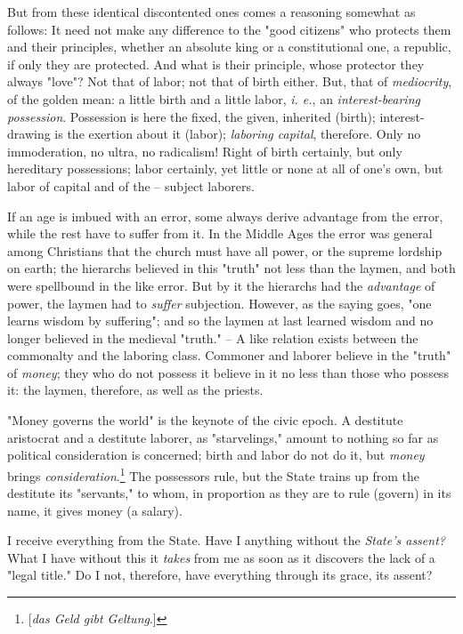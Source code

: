 \documentclass[a4paper]{book}
\begin{document}
But from these identical discontented ones comes a reasoning somewhat as 
follows: It need not make any difference to the "{}good citizens"{} who 
protects them and their principles, whether an absolute king or a 
constitutional one, a republic, if only they are protected. And what is their 
principle, whose protector they always "{}love"{}? Not that of labor; not that 
of birth either. But, that of \textit{mediocrity}, of the golden mean: a 
little birth and a little labor, \textit{i. e.}, an \textit{interest-bearing 
possession}. Possession is here the fixed, the given, inherited (birth); 
interest-drawing is the exertion about it (labor); \textit{laboring capital}, 
therefore. Only no immoderation, no ultra, no radicalism! Right of birth 
certainly, but only hereditary possessions; labor certainly, yet little or 
none at all of one's own, but labor of capital and of the -- subject laborers.

If an age is imbued with an error, some always derive advantage from the 
error, while the rest have to suffer from it. In the Middle Ages the error was 
general among Christians that the church must have all power, or the supreme 
lordship on earth; the hierarchs believed in this "{}truth"{} not less than 
the laymen, and both were spellbound in the like error. But by it the 
hierarchs had the \textit{advantage} of power, the laymen had to 
\textit{suffer} subjection. However, as the saying goes, "{}one learns wisdom 
by suffering"{}; and so the laymen at last learned wisdom and no longer 
believed in the medieval "{}truth."{} -- A like relation exists between the 
commonalty and the laboring class. Commoner and laborer believe in the 
"{}truth"{} of \textit{money}; they who do not possess it believe in it no 
less than those who possess it: the laymen, therefore, as well as the priests.

"{}Money governs the world"{} is the keynote of the civic epoch. A destitute 
aristocrat and a destitute laborer, as "{}starvelings,"{} amount to nothing so 
far as political consideration is concerned; birth and labor do not do it, but 
\textit{money} brings \textit{consideration}.\footnote{[\textit{das Geld gibt 
Geltung}.]} The possessors rule, but the State trains up from the destitute 
its "{}servants,"{} to whom, in proportion as they are to rule (govern) in its 
name, it gives money (a salary).

I receive everything from the State. Have I anything without the 
\textit{State's assent?} What I have without this it \textit{takes} from me as 
soon as it discovers the lack of a "{}legal title."{} Do I not, therefore, 
have everything through its grace, its assent?
\end{document}
